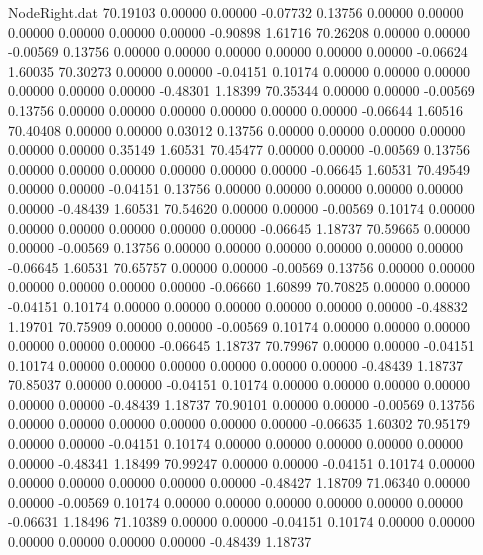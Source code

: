 \begin{filecontents}{NodeRight.dat}
  70.19103    0.00000    0.00000    -0.07732    0.13756    0.00000    0.00000    0.00000    0.00000    0.00000    0.00000   -0.90898    1.61716
  70.26208    0.00000    0.00000    -0.00569    0.13756    0.00000    0.00000    0.00000    0.00000    0.00000    0.00000   -0.06624    1.60035
  70.30273    0.00000    0.00000    -0.04151    0.10174    0.00000    0.00000    0.00000    0.00000    0.00000    0.00000   -0.48301    1.18399
  70.35344    0.00000    0.00000    -0.00569    0.13756    0.00000    0.00000    0.00000    0.00000    0.00000    0.00000   -0.06644    1.60516
  70.40408    0.00000    0.00000     0.03012    0.13756    0.00000    0.00000    0.00000    0.00000    0.00000    0.00000    0.35149    1.60531
  70.45477    0.00000    0.00000    -0.00569    0.13756    0.00000    0.00000    0.00000    0.00000    0.00000    0.00000   -0.06645    1.60531
  70.49549    0.00000    0.00000    -0.04151    0.13756    0.00000    0.00000    0.00000    0.00000    0.00000    0.00000   -0.48439    1.60531
  70.54620    0.00000    0.00000    -0.00569    0.10174    0.00000    0.00000    0.00000    0.00000    0.00000    0.00000   -0.06645    1.18737
  70.59665    0.00000    0.00000    -0.00569    0.13756    0.00000    0.00000    0.00000    0.00000    0.00000    0.00000   -0.06645    1.60531
  70.65757    0.00000    0.00000    -0.00569    0.13756    0.00000    0.00000    0.00000    0.00000    0.00000    0.00000   -0.06660    1.60899
  70.70825    0.00000    0.00000    -0.04151    0.10174    0.00000    0.00000    0.00000    0.00000    0.00000    0.00000   -0.48832    1.19701
  70.75909    0.00000    0.00000    -0.00569    0.10174    0.00000    0.00000    0.00000    0.00000    0.00000    0.00000   -0.06645    1.18737
  70.79967    0.00000    0.00000    -0.04151    0.10174    0.00000    0.00000    0.00000    0.00000    0.00000    0.00000   -0.48439    1.18737
  70.85037    0.00000    0.00000    -0.04151    0.10174    0.00000    0.00000    0.00000    0.00000    0.00000    0.00000   -0.48439    1.18737
  70.90101    0.00000    0.00000    -0.00569    0.13756    0.00000    0.00000    0.00000    0.00000    0.00000    0.00000   -0.06635    1.60302
  70.95179    0.00000    0.00000    -0.04151    0.10174    0.00000    0.00000    0.00000    0.00000    0.00000    0.00000   -0.48341    1.18499
  70.99247    0.00000    0.00000    -0.04151    0.10174    0.00000    0.00000    0.00000    0.00000    0.00000    0.00000   -0.48427    1.18709
  71.06340    0.00000    0.00000    -0.00569    0.10174    0.00000    0.00000    0.00000    0.00000    0.00000    0.00000   -0.06631    1.18496
  71.10389    0.00000    0.00000    -0.04151    0.10174    0.00000    0.00000    0.00000    0.00000    0.00000    0.00000   -0.48439    1.18737

\end{filecontents}
